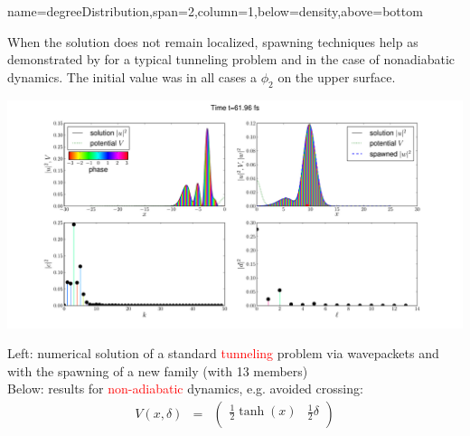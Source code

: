 \documentclass[b0paper,portrait,fontscale=0.24]{baposter}
\newcommand{\alert}[1]{\textcolor{red}{#1}}
\begin{document}
\begin{poster}
  {name=degreeDistribution,span=2,column=1,below=density,above=bottom}{
    When the solution does not remain localized,
    spawning techniques help as demonstrated by \citet{GHJ10b,GHJ10a}
    for a typical tunneling problem and \citet{BGH_natac} in the case of
    nonadiabatic dynamics. The initial value was in all cases a $\phi_{2}$
    on the upper surface.
    \begin{minipage}[c]{.49\linewidth}
      \includegraphics[width=\textwidth]{packetFAM00012000.pdf}
    \end{minipage}
    \begin{minipage}[c]{.5\linewidth}
      Left:
      {numerical solution of a standard \alert{tunneling} problem
        via wavepackets and with the spawning of a new family (with 13 members)}\\
      Below: results for
      \alert{non-adiabatic} dynamics,      e.g. avoided crossing:
      \begin{eqnarray*}\label{III:tanhex}
        V(x,\delta)& = &
        \begin{pmatrix}
          \frac12\tanh(x) & \frac12\delta \\

\end{pmatrix}
\end{eqnarray*}
\end{minipage}}
\end{poster}
\end{document}
